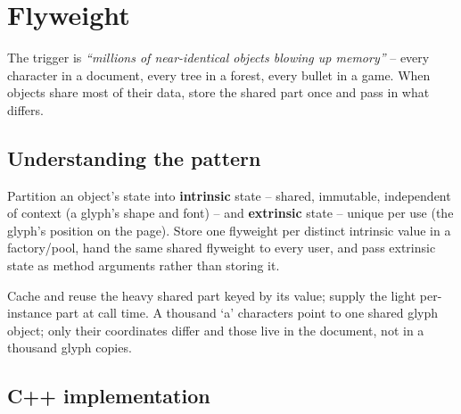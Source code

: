 \section{Flyweight}
\label{sec:pat-flyweight}


\begin{patternbox}
The trigger is \emph{``millions of near-identical objects blowing up
memory''} -- every character in a document, every tree in a forest, every
bullet in a game. When objects share most of their data, store the shared
part once and pass in what differs.
\end{patternbox}

\subsection*{Understanding the pattern}

Partition an object's state into \textbf{intrinsic} state -- shared,
immutable, independent of context (a glyph's shape and font) -- and
\textbf{extrinsic} state -- unique per use (the glyph's position on the
page). Store one flyweight per distinct intrinsic value in a factory/pool,
hand the same shared flyweight to every user, and pass extrinsic state as
method arguments rather than storing it.

\begin{ideabox}
Cache and reuse the heavy shared part keyed by its value; supply the light
per-instance part at call time. A thousand `a' characters point to one
shared glyph object; only their coordinates differ and those live in the
document, not in a thousand glyph copies.
\end{ideabox}

\subsection*{C++ implementation}

